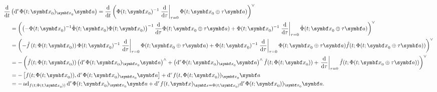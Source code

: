 \begin{equation*}
  \begin{aligned}
    \frac{\mathrm{d}}{\mathrm{d}t}
     & \left( \mathrm{d}^r \Phi(t; \x_0)_{\x_0} \a \right)
    = \frac{\mathrm{d}}{\mathrm{d}t} \left( \Phi(t; \x_{0})^{-1} \left. \frac{\mathrm{d}}{\mathrm{d} \tau} \right|_{\tau = 0} \Phi(t; \x_{0} \oplus \tau \a) \right)^{\vee}                                                                                                                                                                                                                                                                                      \\
     & = \left( \left( -\Phi(t; \x_{0})^{-1} \dot \Phi(t; \x_{0}) \Phi(t; \x_{0}) \right)^{-1} \frac{\mathrm{d}}{\mathrm{d}\tau} \Phi(t; \x_{0} \oplus \tau \a) +  \Phi(t; \x_{0})^{-1} \left. \frac{\mathrm{d}}{\mathrm{d}\tau} \right|_{\tau=0} \dot \Phi(t; \x_{0} \oplus \tau \a) \right)^{\vee}                                                                                                                                                             \\
     & = \left( -\hat f\left(t; \Phi(t; \x_{0})\right) \Phi(t; \x_{0})^{-1} \left. \frac{\mathrm{d}}{\mathrm{d}\tau} \right|_{\tau = 0} \Phi(t; \x_{0} \oplus \tau \a)                                                                                                                + \Phi(t; \x_{0})^{-1} \left. \frac{\mathrm{d}}{\mathrm{d}\tau} \right|_{\tau = 0} \Phi(t; \x_{0} \oplus \tau \a) \hat f(t; \Phi(t; \x_{0} \oplus \tau \a)) \right)^{\vee} \\
     & = - \left( \hat f(t; \Phi(t; \x_{0})) \left( \mathrm{d}^{r} \Phi(t; \x_{0})_{\x_{0}} \a \right)^{\wedge}
    + \left( \mathrm{d}^{r} \Phi(t; \x_{0})_{\x_{0}} \a \right)^{\wedge} \hat f(t; \Phi(t; \x_{0}))  + \left. \frac{\mathrm{d}}{\mathrm{d}\tau} \right|_{\tau = 0} \hat f(t; \Phi(t; \x_{0} \oplus \tau \a)) \right)^{\vee}                                                                                                                                                                                                                                      \\
     & = -\left[  f(t; \Phi(t; \x_{0})), \mathrm{d}^{r} \Phi(t; \x_{0})_{\x_{0}} \a\right] + \mathrm{d}^{r} f(t, \Phi(t; \x_{0}))_{\x_{0}} \a                                                                                                                                                                                                                                                                                                                    \\
     & = -\ad_{f(t; \Phi(t; \x_{0}))} \mathrm{d}^{r} \Phi(t; \x_{0})_{\x_{0}} \a + \mathrm{d}^{r} f(t, \x)_{\x = \Phi(t; \x_{0})} \mathrm{d}^{r} \Phi(t; \x_{0}))_{\x_{0}} \a.
  \end{aligned}
\end{equation*}
